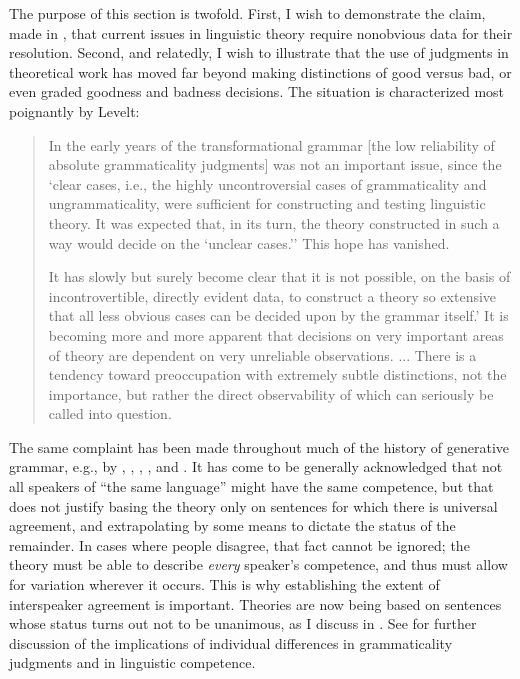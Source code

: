 \noindent The purpose of this section is twofold. First, I wish to demonstrate the claim, made in , that current issues in linguistic theory require nonobvious data for their resolution. Second, and relatedly, I wish to illustrate that the use of judgments in theoretical work has moved far beyond making distinctions of good versus bad, or even graded goodness and badness decisions. The situation is characterized most poignantly by Levelt:

\begin{quote}
In the early years of the transformational grammar [the low reliability of absolute grammaticality judgments] was not an important issue, since the `clear cases, i.e., the highly uncontroversial cases of grammaticality and ungrammaticality, were sufficient for constructing and testing linguistic theory. It was expected that, in its turn, the theory constructed in such a way would decide on the `unclear cases.'' This hope has vanished. \citep[88]{LeveltEtAl1977}

It has slowly but surely become clear that it is not possible, on the basis of incontrovertible, directly evident data, to construct a theory so extensive that all less obvious cases can be decided upon by the grammar itself.' It is becoming more and more apparent that decisions on very important areas of theory are dependent on very unreliable observations. ... There is a tendency toward preoccupation with extremely subtle distinctions, not the importance, but rather the direct observability of which can seriously be called into question. \citep[vol. 2: 6]{Levelt1974}

\end{quote}

The same complaint has been made throughout much of the history of generative grammar, e.g., by \citet[348]{Bever1970a}, \citet[191]{Labov1972a}, \citet{Langendoen1972}, \citet{Coppieters1987}, and \citet[81]{Birdsong1989}. It has come to be generally acknowledged that not all speakers of ``the same language'' might have the same competence, but that does not justify basing the theory only on sentences for which there is universal agreement, and extrapolating by some means to dictate the status of the remainder. In cases where people disagree, that fact cannot be ignored; the theory must be able to describe \textit{every} speaker's competence, and thus must allow for variation wherever it occurs. This is why establishing the extent of interspeaker agreement is important. Theories are now being based on sentences whose status turns out not to be unanimous, as I discuss in . See 
for further discussion of the implications of individual differences in grammaticality judgments  and in linguistic competence.

